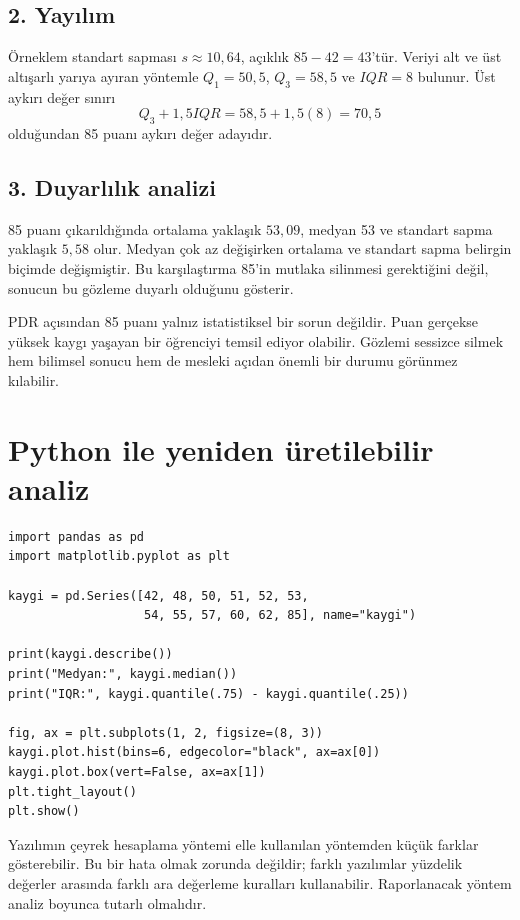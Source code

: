 \subsection*{2. Yayılım}

Örneklem standart sapması $s\approx10{,}64$, açıklık $85-42=43$'tür.
Veriyi alt ve üst altışarlı yarıya ayıran yöntemle $Q_1=50{,}5$,
$Q_3=58{,}5$ ve $IQR=8$ bulunur. Üst aykırı değer sınırı
\[
Q_3+1{,}5IQR=58{,}5+1{,}5(8)=70{,}5
\]
olduğundan 85 puanı aykırı değer adayıdır.

\subsection*{3. Duyarlılık analizi}

85 puanı çıkarıldığında ortalama yaklaşık $53{,}09$, medyan 53 ve standart
sapma yaklaşık $5{,}58$ olur. Medyan çok az değişirken ortalama ve standart
sapma belirgin biçimde değişmiştir. Bu karşılaştırma 85'in mutlaka silinmesi
gerektiğini değil, sonucun bu gözleme duyarlı olduğunu gösterir.

\begin{researchbox}
PDR açısından 85 puanı yalnız istatistiksel bir sorun değildir. Puan gerçekse
yüksek kaygı yaşayan bir öğrenciyi temsil ediyor olabilir. Gözlemi sessizce
silmek hem bilimsel sonucu hem de mesleki açıdan önemli bir durumu görünmez
kılabilir.
\end{researchbox}

\section{Python ile yeniden üretilebilir analiz}

\begin{lstlisting}
import pandas as pd
import matplotlib.pyplot as plt

kaygi = pd.Series([42, 48, 50, 51, 52, 53,
                   54, 55, 57, 60, 62, 85], name="kaygi")

print(kaygi.describe())
print("Medyan:", kaygi.median())
print("IQR:", kaygi.quantile(.75) - kaygi.quantile(.25))

fig, ax = plt.subplots(1, 2, figsize=(8, 3))
kaygi.plot.hist(bins=6, edgecolor="black", ax=ax[0])
kaygi.plot.box(vert=False, ax=ax[1])
plt.tight_layout()
plt.show()
\end{lstlisting}

Yazılımın çeyrek hesaplama yöntemi elle kullanılan yöntemden küçük farklar
gösterebilir. Bu bir hata olmak zorunda değildir; farklı yazılımlar yüzdelik
değerler arasında farklı ara değerleme kuralları kullanabilir. Raporlanacak
yöntem analiz boyunca tutarlı olmalıdır.

